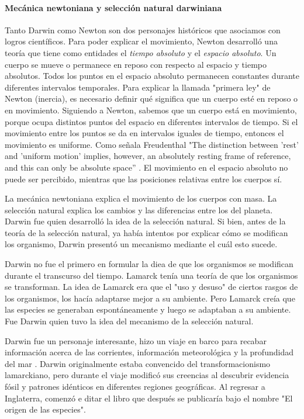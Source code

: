 \paragraph{Mecánica newtoniana y selección natural darwiniana}

Tanto Darwin como Newton son dos personajes históricos que asociamos con logros científicos.
Para poder explicar el movimiento, Newton desarrolló una teoría que tiene como entidades el \emph{tiempo absoluto} y el \emph{espacio absoluto}. 
Un cuerpo se mueve o permanece en reposo con respecto al espacio y tiempo absolutos. 
Todos los puntos en el espacio absoluto permanecen constantes durante diferentes intervalos temporales. 
Para explicar la llamada "primera ley" de Newton (inercia), es necesario definir qué significa que un cuerpo esté en reposo o en movimiento. 
Siguiendo a Newton, sabemos que un cuerpo está en movimiento, porque ocupa distintos puntos del espacio en diferentes intervalos de tiempo.
Si el movimiento entre los puntos se da en intervalos iguales de tiempo, entonces el movimiento es uniforme.
Como señala Freudenthal "The distinction between 'rest' and 'uniform motion' implies, however, an absolutely resting frame of reference, and this can only be absolute space'' \parencite{freudenthalNewtonJustificationTheory1986}.
El movimiento en el espacio absoluto no puede ser percibido, mientras que las posiciones relativas entre los cuerpos sí.

La mecánica newtoniana explica el movimiento de los cuerpos con masa. 
La selección natural explica los cambios y las diferencias entre los del planeta. 
Darwin fue quien desarrolló la idea de la selección natural. 
Si bien, antes de la teoría de la selección natural, ya había intentos por explicar cómo se modifican los organismo, Darwin presentó un mecanismo mediante el cuál esto sucede.

Darwin no fue el primero en formular la diea de que los organismos se modifican durante el transcurso del tiempo.
Lamarck tenía una teoría de que los organismos se transforman.
La idea de Lamarck era que el "uso y desuso" de ciertos rasgos de los organismos, los hacía adaptarse mejor a su ambiente.
Pero Lamarck creía que las especies se generaban espontáneamente y luego se adaptaban a su ambiente. 
Fue Darwin quien tuvo la idea del mecanismo de la selección natural.

Darwin fue un personaje interesante, hizo un viaje en barco para recabar información acerca de las corrientes, información meteorológica y la profundidad del mar \parencite{allen2014}.
Darwin originalmente estaba convencido del transformacionismo lamarckiano, pero durante el viaje modificó sus creencias al descubrir evidencia fósil y patrones idénticos en diferentes regiones geográficas. 
Al regresar a Inglaterra, comenzó e ditar el libro que después se publicaría bajo el nombre "El origen de las especies".

